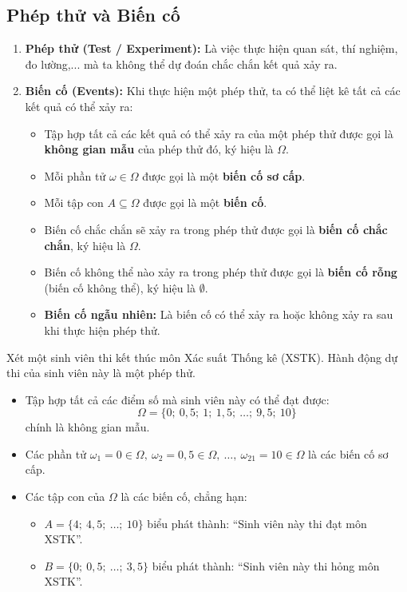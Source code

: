 \subsection{Phép thử và Biến cố}
\begin{enumerate}[label=\alph*), leftmargin=1.5em]
    \item \textbf{Phép thử (Test / Experiment):} 
    Là việc thực hiện quan sát, thí nghiệm, đo lường,... mà ta không thể dự đoán chắc chắn kết quả xảy ra.
    
    \item \textbf{Biến cố (Events):} 
    Khi thực hiện một phép thử, ta có thể liệt kê tất cả các kết quả có thể xảy ra:
    \begin{itemize}[leftmargin=1.5em]
        \item Tập hợp tất cả các kết quả có thể xảy ra của một phép thử được gọi là \textbf{không gian mẫu} của phép thử đó, ký hiệu là $\Omega$.
        \item Mỗi phần tử $\omega \in \Omega$ được gọi là một \textbf{biến cố sơ cấp}.
        \item Mỗi tập con $A \subseteq \Omega$ được gọi là một \textbf{biến cố}.
        \item Biến cố chắc chắn sẽ xảy ra trong phép thử được gọi là \textbf{biến cố chắc chắn}, ký hiệu là $\Omega$.
        \item Biến cố không thể nào xảy ra trong phép thử được gọi là \textbf{biến cố rỗng} (biến cố không thể), ký hiệu là $\emptyset$.
        \item \textbf{Biến cố ngẫu nhiên:} Là biến cố có thể xảy ra hoặc không xảy ra sau khi thực hiện phép thử.
    \end{itemize}
\end{enumerate}

\begin{vidu}
Xét một sinh viên thi kết thúc môn Xác suất Thống kê (XSTK). Hành động dự thi của sinh viên này là một phép thử.
\begin{itemize}
    \item Tập hợp tất cả các điểm số mà sinh viên này có thể đạt được:
    \[
    \Omega = \{0;\ 0{,}5;\ 1;\ 1{,}5;\ \dots;\ 9{,}5;\ 10\}
    \]
    chính là không gian mẫu.
    \item Các phần tử $\omega_1 = 0 \in \Omega,\ \omega_2 = 0{,}5 \in \Omega,\ \dots,\ \omega_{21} = 10 \in \Omega$ là các biến cố sơ cấp.
    \item Các tập con của $\Omega$ là các biến cố, chẳng hạn:
    \begin{itemize}
        \item $A = \{4;\ 4{,}5;\ \dots;\ 10\}$ biểu phát thành: ``Sinh viên này thi đạt môn XSTK''.
        \item $B = \{0;\ 0{,}5;\ \dots;\ 3{,}5\}$ biểu phát thành: ``Sinh viên này thi hỏng môn XSTK''.
    \end{itemize}
\end{itemize}
\end{vidu}


